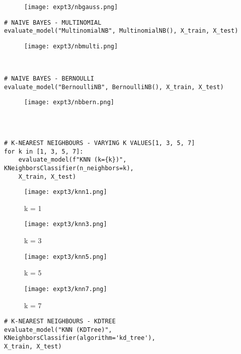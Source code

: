 \documentclass[11pt]{article}
\begin{document}
\begin{figure}[H]
\centering
\texttt{[image: expt3/nbgauss.png]} 
\end{figure}

\begin{verbatim}
# NAIVE BAYES - MULTINOMIAL
evaluate_model("MultinomialNB", MultinomialNB(), X_train, X_test)
\end{verbatim}

\begin{figure}[H]
\centering
\texttt{[image: expt3/nbmulti.png]} 
\end{figure}

\begin{verbatim}


# NAIVE BAYES - BERNOULLI
evaluate_model("BernoulliNB", BernoulliNB(), X_train, X_test)
\end{verbatim}

\begin{figure}[H]
\centering
\texttt{[image: expt3/nbbern.png]} 
\end{figure}

\begin{verbatim}



# K-NEAREST NEIGHBOURS - VARYING K VALUES[1, 3, 5, 7]
for k in [1, 3, 5, 7]:
    evaluate_model(f"KNN (k={k})", KNeighborsClassifier(n_neighbors=k), 
    X_train, X_test)
\end{verbatim}

\begin{figure}[H]
\centering
\texttt{[image: expt3/knn1.png]} 
\caption{k = 1}
\end{figure}

\begin{figure}[H]
\centering
\texttt{[image: expt3/knn3.png]} 
\caption{k = 3}
\end{figure}

\begin{figure}[H]
\centering
\texttt{[image: expt3/knn5.png]} 
\caption{k = 5}
\end{figure}

\begin{figure}[H]
\centering
\texttt{[image: expt3/knn7.png]} 
\caption{k = 7}
\end{figure}

\begin{verbatim}
# K-NEAREST NEIGHBOURS - KDTREE
evaluate_model("KNN (KDTree)", KNeighborsClassifier(algorithm='kd_tree'), 
X_train, X_test)
\end{verbatim}
\end{document}
